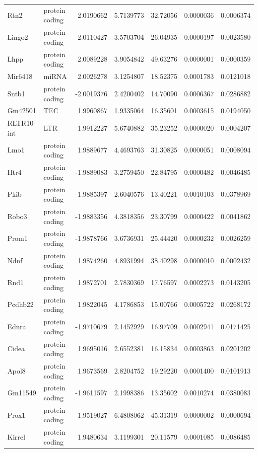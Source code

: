 \documentclass[onehalf,12pt]{beavtex}
\begin{document}
\begin{longtable}{llrrrrr}
  \addlinespace
  Rtn2 & protein coding & 2.0190662 & 5.7139773 & 32.72056 & 0.0000036 & 0.0006374\\
  Lingo2 & protein coding & -2.0110427 & 3.5703704 & 26.04935 & 0.0000197 & 0.0023580\\
  Lhpp & protein coding & 2.0089228 & 3.9054842 & 49.63276 & 0.0000001 & 0.0000359\\
  Mir6418 & miRNA & 2.0026278 & 3.1254807 & 18.52375 & 0.0001783 & 0.0121018\\
  Sntb1 & protein coding & -2.0019376 & 2.4200402 & 14.70090 & 0.0006367 & 0.0286882\\
  \addlinespace
  Gm42501 & TEC & 1.9960867 & 1.9335064 & 16.35601 & 0.0003615 & 0.0194050\\
  RLTR10-int & LTR & 1.9912227 & 5.6740882 & 35.23252 & 0.0000020 & 0.0004207\\
  Lmo1 & protein coding & 1.9889677 & 4.4693763 & 31.30825 & 0.0000051 & 0.0008094\\
  Htr4 & protein coding & -1.9889083 & 3.2759450 & 22.84795 & 0.0000482 & 0.0046485\\
  Pkib & protein coding & -1.9885397 & 2.6040576 & 13.40221 & 0.0010103 & 0.0378969\\
  \addlinespace
  Robo3 & protein coding & -1.9883356 & 4.3818356 & 23.30799 & 0.0000422 & 0.0041862\\
  Prom1 & protein coding & -1.9878766 & 3.6736931 & 25.44420 & 0.0000232 & 0.0026259\\
  Ndnf & protein coding & 1.9874260 & 4.8931994 & 38.40298 & 0.0000010 & 0.0002432\\
  Rnd1 & protein coding & 1.9872701 & 2.7830369 & 17.76597 & 0.0002273 & 0.0143205\\
  Pcdhb22 & protein coding & 1.9822045 & 4.1786853 & 15.00766 & 0.0005722 & 0.0268172\\
  \addlinespace
  Ednra & protein coding & -1.9710679 & 2.1452929 & 16.97709 & 0.0002941 & 0.0171425\\
  Cidea & protein coding & 1.9695016 & 2.6552381 & 16.15834 & 0.0003863 & 0.0201202\\
  Apol8 & protein coding & 1.9673569 & 2.8204752 & 19.29220 & 0.0001400 & 0.0101913\\
  Gm11549 & protein coding & -1.9611597 & 2.1998386 & 13.35602 & 0.0010274 & 0.0380083\\
  Prox1 & protein coding & -1.9519027 & 6.4808062 & 45.31319 & 0.0000002 & 0.0000694\\
  \addlinespace
  Kirrel & protein coding & 1.9480634 & 3.1199301 & 20.11579 & 0.0001085 & 0.0086485\\

\end{longtable}
\end{document}
